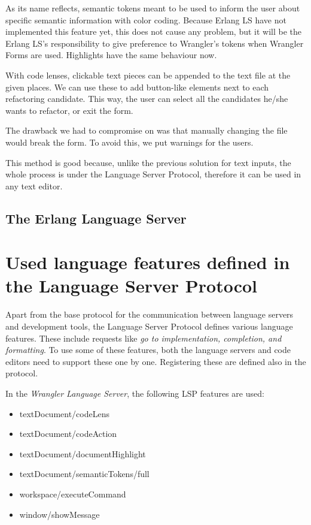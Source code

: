 \begin{note}
    As its name reflects, semantic tokens meant to be used to inform the user about specific semantic information with color coding.
    Because Erlang LS have not implemented this feature yet, this does not cause any problem, but it will be the Erlang LS's responsibility to give preference to Wrangler's tokens when Wrangler Forms are used. Highlights have the same behaviour now.
\end{note}

With code lenses, clickable text pieces can be appended to the text file at the given places. We can use these to add button-like elements next to each refactoring candidate. This way, the user can select all the candidates he/she wants to refactor, or exit the form.

The drawback we had to compromise on was that manually changing the file would break the form. To avoid this, we put warnings for the users.

This method is good because, unlike the previous solution for text inputs, the whole process is under the Language Server Protocol, therefore it can be used in any text editor.

\subsection{The Erlang Language Server}


\section{Used language features defined in the Language Server Protocol}

Apart from the base protocol for the communication between language servers and development tools, the Language Server Protocol defines various language features. These include requests like \textit{go to implementation, completion, and formatting}. To use some of these features, both the language servers and code editors need to support these one by one. Registering these are defined also in the protocol.\cite{LSP}

In the \emph{Wrangler Language Server}, the following LSP features are used:

\begin{itemize}
    \item textDocument/codeLens
    \item textDocument/codeAction
    \item textDocument/documentHighlight
    \item textDocument/semanticTokens/full
    \item workspace/executeCommand
    \item window/showMessage
\end{itemize}

